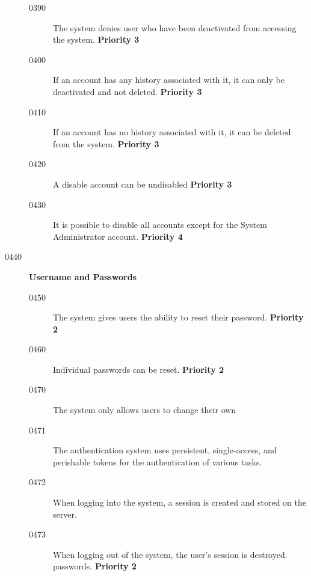 \documentclass{article}
\begin{document}
\begin{description}
    \begin{description}

    \item[0390] The system denies user who have been deactivated from
      accessing the system. \textbf{Priority 3}
    \item[0400] If an account has any history associated with it, it can only
      be deactivated and not deleted. \textbf{Priority 3}
    \item[0410] If an account has no history associated with it, it can be
      deleted from the system. \textbf{Priority 3}
    \item[0420] A disable account can be undisabled \textbf{Priority 3}
    \item[0430] It is possible to disable all accounts except for the System
      Administrator account. \textbf{Priority 4}
    \end{description}

  
\item[0440] \textbf{Username and Passwords}

  \begin{description}

  \item[0450] The system gives users the ability to reset their password. \textbf{Priority 2}
  \item[0460] Individual passwords can be reset. \textbf{Priority 2}
  \item[0470] The system only allows users to change their own
  \item[0471] The authentication system uses persistent, single-access,
    and perishable tokens for the authentication of various tasks. 
  \item[0472] When logging into the system, a session is created and stored
    on the server.
  \item[0473] When logging out of the system, the user's session is destroyed.
  passwords. \textbf{Priority 2}

  \end{description}

\end{description}
\end{document}
